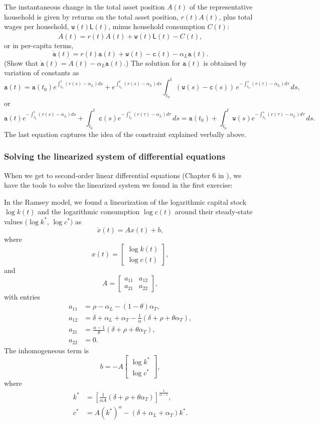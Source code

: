 \documentclass[graybox]{svmult}
\begin{document}
The instantaneous change in the total asset position $A(t)$ of the representative household is given by returns on the total asset position, $r(t)A(t)$, plus total wages per household, $\texttt{w}(t)\mathsf{L}(t)$, minus household consumption $C(t)$:
\[
\dot{A}(t) = r(t)A(t) + \texttt{w}(t)\mathsf{L}(t) - C(t),
\]
or in per-capita terms,
\[
\dot{\texttt{a}}(t) = r(t)\texttt{a}(t) + \texttt{w}(t) - \texttt{c}(t) - \alpha_L \texttt{a}(t).
\]
(Show that $\dot{\texttt{a}}(t) = \dot{A}(t) - \alpha_L \texttt{a}(t)$.) The solution for $\texttt{a}(t)$ is obtained by variation of constants as
\[
\texttt{a}(t) = \texttt{a}(t_0)e^{\int_{t_0}^t (r(s)-\alpha_L)ds} + e^{\int_{t_0}^t (r(s)-\alpha_L)ds} \int_{t_0}^t (\texttt{w}(s)-\texttt{c}(s))\, e^{-\int_{t_0}^s (r(\tau)-\alpha_L)d\tau}\, ds,
\]
or
\[
\texttt{a}(t)e^{-\int_{t_0}^t (r(s)-\alpha_L)ds} + \int_{t_0}^t \texttt{c}(s) e^{-\int_{t_0}^s (r(\tau)-\alpha_L)d\tau}\, ds = \texttt{a}(t_0) + \int_{t_0}^t \texttt{w}(s) e^{-\int_{t_0}^s (r(\tau)-\alpha_L)d\tau}\, ds.
\]
The last equation captures the idea of the constraint explained verbally above.


\subsubsection{Solving the linearized system of differential equations}

When we get to second-order linear differential equations (Chapter 6 in \cite{Sydsaeter2008}), we have the tools to solve the linearized system we found in the first exercise:

In the Ramsey model, we found a linearization of the logarithmic capital stock $\log k(t)$ and the logarithmic consumption $\log c(t)$ around their steady-state values $(\log k^*$, $\log c^*)$ as
\[
\dot{x}(t) = A x(t) + b,
\]
where
\[
x(t) = \left[\begin{array}{c}\log k(t) \\ \log c(t)\end{array}\right],
\]
and
\[
A = \left[\begin{array}{cc}
a_{11} & a_{12} \\
a_{21} & a_{22}
\end{array}\right],
\]
with entries
\begin{align*}
a_{11} &= \rho - \alpha_L - (1-\theta) \alpha_T,\\
a_{12} &= \delta + \alpha_L + \alpha_T - \frac{1}{\alpha}(\delta + \rho + \theta\alpha_T),\\
a_{21} &= \frac{\alpha -1}{\theta} (\delta + \rho + \theta\alpha_T),\\
a_{22} &= 0.
\end{align*}
The inhomogeneous term is
\[
b = -A \left[\begin{array}{c} \log k^* \\ \log c^* \end{array}\right],
\]
where
\begin{align*}
k^* &= \left[  \frac{1}{\alpha A} (\delta + \rho + \theta\alpha_T)  \right]^{\frac{1}{\alpha -1}},\\
c^* &= A (k^*)^\alpha - (\delta + \alpha_L + \alpha_T) k^*.
\end{align*}
\end{document}
